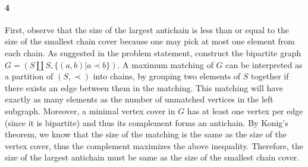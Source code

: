 \documentclass{article}
\begin{document}
\paragraph{4} First, observe that the size of the largest antichain is less than or equal to the size of the smallest chain cover because one may pick at most one element from each chain.  As suggested in the problem statement, construct the bipartite graph $G = (S \coprod S, \{ (a,b) | a \prec b \})$.  A maximum matching of $G$ can be interpreted as a partition of $( S, \prec )$ into chains, by grouping two elements of $S$ together if there exists an edge between them in the matching.  This matching will have exactly as many elements as the number of unmatched vertices in the left subgraph.  Moreover, a minimal vertex cover in $G$ has at least one vertex per edge (since it is bipartite) and thus its complement forms an antichain.  By Konig's theorem, we know that the size of the matching is the same as the size of the vertex cover, thus the complement maximizes the above inequality.  Therefore, the size of the largest antichain must be same as the size of the smallest chain cover.
\end{document}
